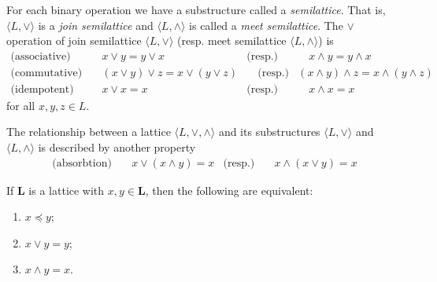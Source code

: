 For each binary operation we have a substructure called a \textit{semilattice}. That is, $\langle L, \vee \rangle$ is a \textit{join semilattice} and $\langle L, \wedge \rangle$ is called a \textit{meet semilattice}. The $\vee$ operation of join semilattice $\langle L, \vee \rangle$ (resp. meet semilattice $\langle L, \wedge \rangle$) is
\vspace{-1em}
\begin{align}
     \text{(associative)} & \quad x \vee y = y \vee x & \text{(resp.)}  & \quad x \wedge y = y \wedge x \\
     \text{(commutative)} & \quad (x \vee y) \vee z = x \vee (y \vee z) & \quad \text{(resp.)} & (x \wedge y) \wedge z = x \wedge (y \wedge z) \\ 
     \text{(idempotent)}  & \quad x \vee x = x & \text{(resp.)}  & \quad x \wedge x = x
\end{align}
for all $x,y,z \in L$. 

The relationship between a lattice $\langle L, \vee, \wedge \rangle$ and its substructures $\langle L, \vee\rangle$ and $\langle L, \wedge \rangle$ is described by another property
\vspace{-1em}
\begin{align}
     \text{(absorbtion)} & \quad x \vee (x \wedge y) = x & \text{(resp.)}  & \quad x \wedge (x \vee y) = x 
\end{align}


\begin{lemma}
  \label{lemma:the-connecting-lemma}
  If $\mathbf{L}$ is a lattice with $x, y \in \mathbf{L}$, then the following are equivalent:
  \begin{enumerate}
      \setlength\itemsep{0pt}
      \setlength\parsep{0pt}
    \item $x \preceq y$;
    \item $x \vee y = y$;
    \item $x \wedge y = x$.
  \end{enumerate}
\end{lemma}

